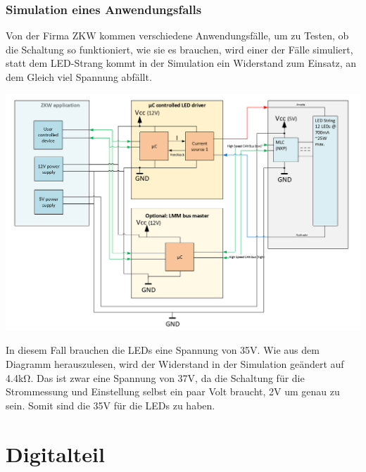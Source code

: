 \documentclass[paper=a4, 12pt]{scrreprt}
\begin{document}
			\subsubsection{Simulation eines Anwendungsfalls}\hfill \break
			Von der Firma ZKW kommen verschiedene Anwendungsfälle, um zu Testen, ob die Schaltung so funktioniert, wie sie es brauchen, wird einer der Fälle simuliert, statt dem LED-Strang kommt in der Simulation ein Widerstand zum Einsatz, an dem Gleich viel Spannung abfällt.
			\begin{adjustbox}{center,caption={Anwendungsfall von ZKW},label={fig:anwendungsfall},nofloat=figure,vspace=\bigskipamount}
				\includegraphics[width=\textwidth]{img/SimulierterAnwendungsfall.PNG}
			\end{adjustbox}
			In diesem Fall brauchen die LEDs eine Spannung von 35V. Wie aus dem Diagramm herauszulesen, wird der Widerstand in der Simulation geändert auf 4.4kΩ. Das ist zwar eine Spannung von 37V, da die Schaltung für die Strommessung und Einstellung selbst ein paar Volt braucht, 2V um genau zu sein. Somit sind die 35V für die LEDs zu haben. 
			\newpage
			
	\section{Digitalteil}
\end{document}

